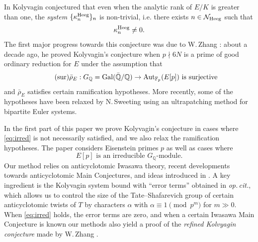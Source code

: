 \documentclass[10pt,reqno]{amsart}
\numberwithin{equation}{section}
\theoremstyle{plain}
\theoremstyle{definition}
\theoremstyle{definition}
\theoremstyle{plain}
\theoremstyle{plain}
\theoremstyle{plain}
\theoremstyle{plain}
\theoremstyle{plain}
\theoremstyle{plain}
\newcommand{\Q}{\mathbb{Q}}
\newcommand{\sk}{\vspace{0.1in}}
\begin{document}
In \cite{kolystructure} Kolyvagin  conjectured
that even when the analytic rank of $E/K$ is greater than one, 
the \emph{system} $\{\kappa_{n}^{\rm Heeg}\}_{n}$ is non-trivial,  i.e. there exists $n\in \mathcal{N}_{\rm Heeg}$ such that $$\kappa_{n}^{\rm Heeg}\neq 0.$$ 
The first major progress towards this conjecture was due to W.\,Zhang \cite{zhang_ind}: about a decade ago, he proved Kolyvagin's conjecture 
when $p\nmid 6N$ is a prime of good ordinary reduction for $E$ %
under the assumption that
\begin{equation}\label{eq:irred}
\tag{sur}
\textrm{$\bar{\rho}_E: G_{\Q}=\operatorname{Gal}(\bar{\Q}/\Q)\to{\rm Aut}_{\mathbb{F}_p}(E[p])$ is surjective}
\end{equation}
and $\bar{\rho}_E$ satisfies certain ramification hypotheses. More recently, 
some of the hypotheses have been 
relaxed by N.\,Sweeting  \cite{sweeting} using an ultrapatching method for bipartite Euler systems. 

In the first part of this paper we prove Kolyvagin's conjecture in cases where \eqref{eq:irred} is not necessarily satisfied, and we also relax the ramification hypotheses. The paper considers Eisenstein primes $p$ as well as cases where
\begin{equation}\label{eq:irr}
\tag{irr}
\text{$E[p]$ is an irreducible $G_\Q$-module.}
\end{equation}
Our method relies on anticyclotomic Iwasawa theory, recent developments towards anticyclotomic Main Conjectures, and ideas 
 introduced in \cite{eisenstein_cyc}. %
A key ingredient is 
the Kolyvagin system bound with ``error terms'' obtained in \emph{op.\,cit.}, which allows us to control the size of the Tate--Shafarevich group of certain anticyclotomic twists of $T$ %
by characters $\alpha$ with $\alpha\equiv 1\pmod{p^m}$ for $m\gg 0$. 
When \eqref{eq:irred} holds, the error terms are zero,
and when a certain Iwasawa Main Conjecture is known our methods also yield a proof of the \emph{refined Kolvyagin conjecture} made by W.\,Zhang \cite[Conj.~4.5]{zhang-CDM}.
%
\sk
\end{document}
